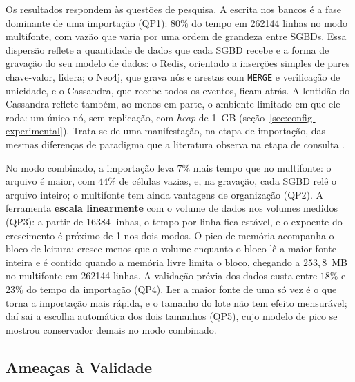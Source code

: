 Os resultados respondem às questões de pesquisa. A escrita nos bancos é a fase dominante de
uma importação (QP1): $80\%$ do tempo em \num{262144} linhas no modo multifonte, com vazão
que varia por uma ordem de grandeza entre SGBDs. Essa dispersão reflete a quantidade de dados
que cada SGBD recebe e a forma de gravação do seu modelo de dados: o Redis, orientado a
inserções simples de pares chave-valor, lidera; o Neo4j, que grava nós e arestas com
\texttt{MERGE} e verificação de unicidade, e o Cassandra, que recebe todos os eventos, ficam
atrás. A lentidão do Cassandra reflete também, ao menos em parte, o ambiente limitado em que
ele roda: um único nó, sem replicação, com \textit{heap} de 1~GB
(seção~\ref{sec:config-experimental}). Trata-se de uma manifestação, na etapa de importação,
das mesmas diferenças de paradigma que a literatura observa na etapa de consulta
\cite{muniswamaiah2023comparison, vanlanduyt2023comparative}.

No modo combinado, a importação leva $7\%$ mais tempo que no multifonte: o arquivo é maior,
com $44\%$ de células vazias, e, na gravação, cada SGBD relê o arquivo inteiro; o multifonte
tem ainda vantagens de organização (QP2). A ferramenta \textbf{escala linearmente} com o
volume de dados nos volumes medidos (QP3): a partir de \num{16384} linhas, o tempo por linha
fica estável, e o expoente do crescimento é próximo de 1 nos dois modos.
O pico de memória acompanha o bloco de leitura: cresce menos que o volume enquanto o bloco
lê a maior fonte inteira e é contido quando a memória livre limita o bloco, chegando a
$253{,}8$~MB no multifonte em \num{262144} linhas. A validação prévia dos dados custa entre
$18\%$ e $23\%$ do tempo da importação (QP4). Ler a maior fonte de uma só vez é o que torna a importação mais rápida, e
o tamanho do lote não tem efeito mensurável; daí sai a escolha automática dos dois tamanhos
(QP5), cujo modelo de pico se mostrou conservador demais no modo combinado.

\subsection{Ameaças à Validade}
\label{sec:ameacas-validade}

